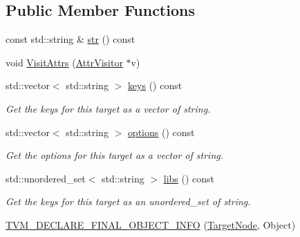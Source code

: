 \subsection*{Public Member Functions}
\begin{DoxyCompactItemize}
\item 
const std\+::string \& \hyperlink{classtvm_1_1TargetNode_a04c6114b51f49035a69f6df8db0abaa0}{str} () const 
\item 
void \hyperlink{classtvm_1_1TargetNode_ad4a9f21d97d244c2055e9ba2eca71ee5}{Visit\+Attrs} (\hyperlink{classtvm_1_1AttrVisitor}{Attr\+Visitor} $\ast$v)
\item 
std\+::vector$<$ std\+::string $>$ \hyperlink{classtvm_1_1TargetNode_a83a72db573e343416e50d30b0991420c}{keys} () const 
\begin{DoxyCompactList}\small\item\em Get the keys for this target as a vector of string. \end{DoxyCompactList}\item 
std\+::vector$<$ std\+::string $>$ \hyperlink{classtvm_1_1TargetNode_a8bbfe78ad27505e54e34e968de8ca0b4}{options} () const 
\begin{DoxyCompactList}\small\item\em Get the options for this target as a vector of string. \end{DoxyCompactList}\item 
std\+::unordered\+\_\+set$<$ std\+::string $>$ \hyperlink{classtvm_1_1TargetNode_a1d3a6c7cb961944c78d50bf6113aded8}{libs} () const 
\begin{DoxyCompactList}\small\item\em Get the keys for this target as an unordered\+\_\+set of string. \end{DoxyCompactList}\item 
\hyperlink{classtvm_1_1TargetNode_a8602fa00bc833f39fa16b682acd704b7}{T\+V\+M\+\_\+\+D\+E\+C\+L\+A\+R\+E\+\_\+\+F\+I\+N\+A\+L\+\_\+\+O\+B\+J\+E\+C\+T\+\_\+\+I\+N\+FO} (\hyperlink{classtvm_1_1TargetNode}{Target\+Node}, Object)
\end{DoxyCompactItemize}
